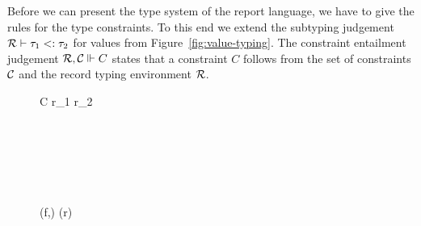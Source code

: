 Before we can present the type system of the report language, we have
to give the rules for the type constraints. To this end we extend the
subtyping judgement ${\mathcal R} \vdash \tau_1 <: \tau_2$ for values
from Figure~\ref{fig:value-typing}. The constraint entailment
judgement ${\mathcal R}, {\mathcal C} \Vdash C$ states that a constraint $C$
follows from the set of constraints ${\mathcal C}$ and the record typing
environment ${\mathcal R}$.
\begin{figure}
  \centering%
  \small%
  {C \in \calC}%
  {}%
  \quad%
  {r_1 \subrec r_2}%
  {}%
  \\[1em]%
  {\constrEnt{\calR}{\calC}{\tau <: \tau}}%
  \quad%
  {}
  {}
  {}
  \\[1em]%
  {\constrEnt\calR{}}
  {\constrEnt\calR{}}
  {\constrEnt\calR{}}
  \quad%
  {\constrEnt\calR{}}
  {\constrEnt\calR{}}
  \\[1em]%
  {\constrEnt\calR{}}
  {\constrEnt\calR{}}
  {\constrEnt\calR{}}
  \\[1em]%
  {\constrEnt\calR{}}
  {\constrEnt\calR{}}
  {\constrEnt\calR{}}
  \\[1em]%
  {\constrEnt\calR\calC{\tint <: \treal}}
  \quad%
  {\constrEnt\calR\calC{\ttimestamp <: \tdt}}
  \\[1em]%
  {\constrEnt\calR\calC{\tduration <: \tdt}}
  \\[2em]
  {(f,\tau) \in \rho(r)}
  {}
  \\[1em]%
  {\constrEnt\calR{}}%
  {\constrEnt\calR{}}%
  {\constrEnt\calR{}}
  \\[2em]%
  {\tau \in \set{\tbool, \tint, \treal, \tchar, \tduration, \ttimestamp, \tdt}}%

\end{figure}
